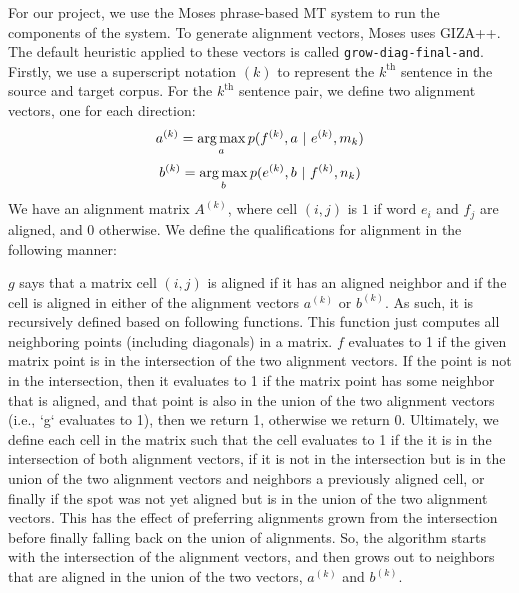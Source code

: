 \documentclass[twocolumn]{article}
\newcommand{\originalAlign}{\texttt{grow-diag-final-and}}
\begin{document}
For our project, we use the Moses phrase-based MT system to run the components
of the system. To generate alignment vectors, Moses uses GIZA++. The default
heuristic applied to these vectors is called \originalAlign{}.
Firstly, we use a superscript notation $(k)$ to represent the $k^{\text{th}}$
sentence in the source and target corpus.
For the $k^{\text{th}}$ sentence pair, we define two alignment vectors, one for
each direction:
\[ a^{(k)} = \argmax_a p(f^{(k)}, a\ |\ e^{(k)}, m_k) \]
\[ b^{(k)} = \operatorname*{arg\,max}_b p(e^{(k)}, b\ |\ f^{(k)}, n_k) \]
We have an alignment matrix $A^{(k)}$, where cell $(i,j)$ is $1$ if word $e_i$
and $f_j$ are aligned, and $0$ otherwise.
We define the qualifications for alignment in the following manner:

$g$ says that a matrix cell $(i,j)$ is aligned if it has an aligned
neighbor and if the cell is aligned in either of the alignment vectors
$a^{(k)}$ or $b^{(k)}$.
As such, it is recursively defined based on following functions.
\wrapSmall{\isAlignedFromGrow{}}
%
%
This function just computes all neighboring points (including diagonals) in a
matrix.
\wrapSmall{\neighborsFunc{}}
%
$f$ evaluates to 1 if the given matrix point is in the
intersection of the two alignment vectors.
If the point is not in the intersection, then it evaluates to 1
if the matrix point has some neighbor that is aligned, and that point is also
in the union of the two alignment vectors (i.e., `g` evaluates to 1), then
we return 1, otherwise we return 0.
\wrapSmall{\isAlignedFromInterOrGrow{}}
%
Ultimately, we define each cell in the matrix such that
the cell evaluates to 1 if the it is in the
intersection of both alignment vectors, if it is not in the intersection but is
in the union of the two alignment vectors and neighbors a previously aligned
cell, or finally if the spot was not yet aligned but is in the union of the two
alignment vectors. This has the effect of preferring alignments grown from the
intersection before finally falling back on the union of alignments.
\wrapSmall{\growDiagMatrix{}}
%
%
So, the algorithm starts with the intersection of the alignment vectors, and
then grows out to neighbors that are aligned in the union of the two vectors,
$a^{(k)}$ and $b^{(k)}$.


\end{document}
